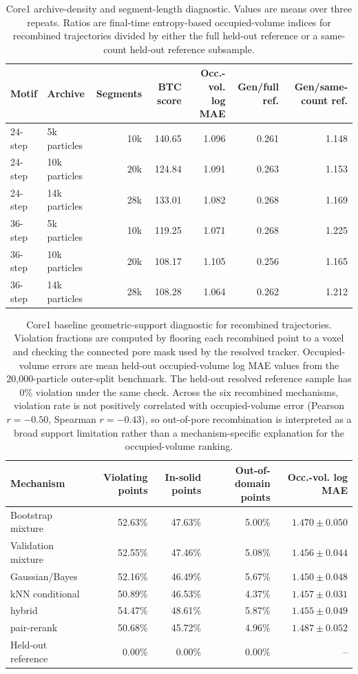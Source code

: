 \documentclass[11pt]{article}
\newcommand{\gb}{Gaussian/Bayes}
\newcommand{\knn}{kNN}
\newcommand{\hybrid}{hybrid}
\newcommand{\pair}{pair-rerank}
\begin{document}
\begin{table}[!htbp]
\centering
\caption{Core1 archive-density and segment-length diagnostic. Values are means over three repeats. Ratios are final-time entropy-based occupied-volume indices for recombined trajectories divided by either the full held-out reference or a same-count held-out reference subsample.}
\label{tab:Sarchiveconv}
\scriptsize
\begin{tabular}{llrrrrr}
\toprule
Motif & Archive & Segments & BTC score & Occ.-vol. log MAE & Gen/full ref. & Gen/same-count ref. \\
\midrule
24-step & 5k particles & 10k & 140.65 & 1.096 & 0.261 & 1.148 \\
24-step & 10k particles & 20k & 124.84 & 1.091 & 0.263 & 1.153 \\
24-step & 14k particles & 28k & 133.01 & 1.082 & 0.268 & 1.169 \\
36-step & 5k particles & 10k & 119.25 & 1.071 & 0.268 & 1.225 \\
36-step & 10k particles & 20k & 108.17 & 1.105 & 0.256 & 1.165 \\
36-step & 14k particles & 28k & 108.28 & 1.064 & 0.262 & 1.212 \\
\bottomrule
\end{tabular}
\end{table}

\begin{table}[!htbp]
\centering
\caption{Core1 baseline geometric-support diagnostic for recombined trajectories. Violation fractions are computed by flooring each recombined point to a voxel and checking the connected pore mask used by the resolved tracker. Occupied-volume errors are mean held-out occupied-volume log MAE values from the 20,000-particle outer-split benchmark. The held-out resolved reference sample has 0\% violation under the same check. Across the six recombined mechanisms, violation rate is not positively correlated with occupied-volume error (Pearson $r=-0.50$, Spearman $r=-0.43$), so out-of-pore recombination is interpreted as a broad support limitation rather than a mechanism-specific explanation for the occupied-volume ranking.}
\label{tab:Sgeom}
\scriptsize
\setlength{\tabcolsep}{3pt}
\begin{tabular}{@{}L{1.65in}rrrr@{}}
\toprule
Mechanism & Violating points & In-solid points & Out-of-domain points & Occ.-vol. log MAE \\
\midrule
Bootstrap mixture & 52.63\% & 47.63\% & 5.00\% & $1.470\pm0.050$ \\
Validation mixture & 52.55\% & 47.46\% & 5.08\% & $1.456\pm0.044$ \\
\gb{} & 52.16\% & 46.49\% & 5.67\% & $1.450\pm0.048$ \\
\knn{} conditional & 50.89\% & 46.53\% & 4.37\% & $1.457\pm0.031$ \\
\hybrid{} & 54.47\% & 48.61\% & 5.87\% & $1.455\pm0.049$ \\
\pair{} & 50.68\% & 45.72\% & 4.96\% & $1.487\pm0.052$ \\
Held-out reference & 0.00\% & 0.00\% & 0.00\% & -- \\
\bottomrule
\end{tabular}
\end{table}
\end{document}
